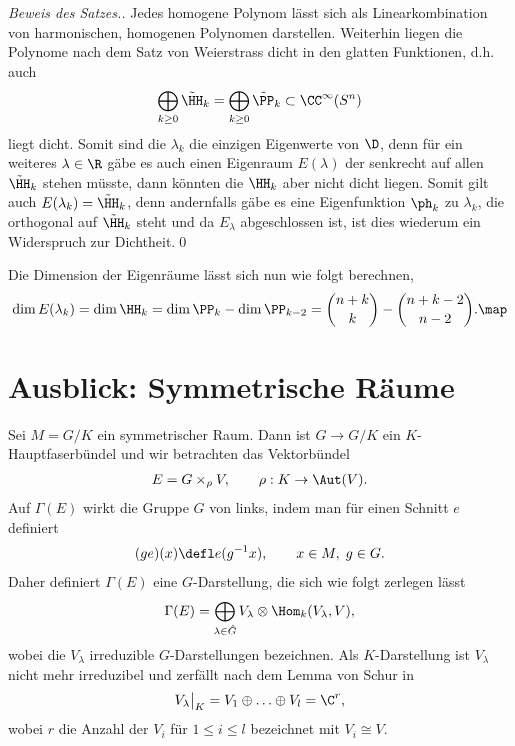 \documentclass[%
	paper=a5,%
	fleqn,%
	DIV=18,%
	BCOR=0mm,
	fontsize=11pt,
	titlepage=false,%
	bibliography=totoc,
	DIV=18,%
	twoside=true,
	pdftitle=Riemannsche Geometrie,
	pdfauthor=Uwe Semmelmann,
	numbers=noendperiod]%
	{scrbook}
\begin{document}
\begin{proof}[Beweis des Satzes.]
Jedes homogene Polynom lässt sich als Linearkombination von harmonischen, homogenen Polynomen darstellen. Weiterhin liegen die Polynome nach dem Satz von Weierstrass dicht in den glatten Funktionen, d.h. auch
\begin{align*}
\bigoplus_{k\ge 0}\tilde\HH_{k} = \bigoplus_{k\ge 0}\tilde\PP_{k} \subset \CC^\infty(S^n)
\end{align*}
liegt dicht. Somit sind die $\lambda_{k}$ die einzigen Eigenwerte von $\D$, denn für ein weiteres $\lambda\in\R$ gäbe es auch einen Eigenraum $E(\lambda)$ der senkrecht auf allen $\tilde\HH_{k}$ stehen müsste, dann könnten die $\HH_{k}$ aber nicht dicht liegen. Somit gilt auch $E(\lambda_{k}) = \tilde\HH_{k}$, denn andernfalls gäbe es eine Eigenfunktion $\ph_{k}$ zu $\lambda_{k}$, die orthogonal auf $\tilde\HH_{k}$ steht und da $E_{\lambda}$ abgeschlossen ist, ist dies wiederum ein Widerspruch zur Dichtheit.\qed
\end{proof}

\begin{rem}
Die Dimension der Eigenräume lässt sich nun wie folgt berechnen,
\begin{align*}
\dim E(\lambda_{k}) = \dim \HH_{k} = 
\dim \PP_{k}-\dim\PP_{k-2} =
\binom{n+k}{k} - 
\binom{n+k-2}{n-2}.\map
\end{align*}
\end{rem}

\section{Ausblick: Symmetrische Räume}

Sei $M=G/K$ ein symmetrischer Raum. Dann ist $G\to G/K$ ein $K$-Hauptfaserbündel und wir betrachten das Vektorbündel
\begin{align*}
E = G\times_{\rho}V,\qquad \rho: K\to \Aut(V).
\end{align*}
Auf $\Gamma(E)$ wirkt die Gruppe $G$ von links, indem man für einen Schnitt $e$ definiert
\begin{align*}
(ge)(x) \defl e(g^{-1}x),\qquad x\in M,\; g\in G.
\end{align*}
Daher definiert $\Gamma(E)$ eine $G$-Darstellung, die sich wie folgt zerlegen lässt
\begin{align*}
\Gamma(E) = \bigoplus_{\lambda\in\hat{G}} V_{\lambda}\otimes \Hom_{k}(V_{\lambda},V),
\end{align*}
wobei die $V_{\lambda}$ irreduzible $G$-Darstellungen bezeichnen. Als $K$-Darstellung ist $V_{\lambda}$ nicht mehr irreduzibel und zerfällt nach dem Lemma von Schur in
\begin{align*}
V_{\lambda}\big|_{K} = V_{1}\oplus \ldots \oplus V_{l} = \C^r,
\end{align*}
wobei $r$ die Anzahl der $V_{i}$ für $1\le i\le l$ bezeichnet mit $V_{i}\cong V$.
\end{document}
